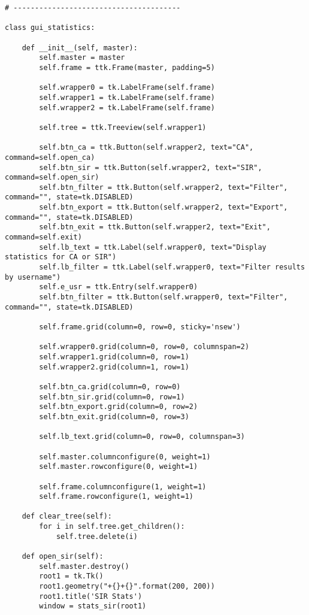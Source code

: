\documentclass[11pt, a4paper]{article}
\begin{document}
\begin{lstlisting}
# ---------------------------------------

class gui_statistics:

    def __init__(self, master):
        self.master = master
        self.frame = ttk.Frame(master, padding=5)

        self.wrapper0 = tk.LabelFrame(self.frame)
        self.wrapper1 = tk.LabelFrame(self.frame)
        self.wrapper2 = tk.LabelFrame(self.frame)

        self.tree = ttk.Treeview(self.wrapper1)

        self.btn_ca = ttk.Button(self.wrapper2, text="CA", command=self.open_ca)
        self.btn_sir = ttk.Button(self.wrapper2, text="SIR", command=self.open_sir)
        self.btn_filter = ttk.Button(self.wrapper2, text="Filter", command="", state=tk.DISABLED)
        self.btn_export = ttk.Button(self.wrapper2, text="Export", command="", state=tk.DISABLED)
        self.btn_exit = ttk.Button(self.wrapper2, text="Exit", command=self.exit)
        self.lb_text = ttk.Label(self.wrapper0, text="Display statistics for CA or SIR")
        self.lb_filter = ttk.Label(self.wrapper0, text="Filter results by username")
        self.e_usr = ttk.Entry(self.wrapper0)
        self.btn_filter = ttk.Button(self.wrapper0, text="Filter", command="", state=tk.DISABLED)

        self.frame.grid(column=0, row=0, sticky='nsew')

        self.wrapper0.grid(column=0, row=0, columnspan=2)
        self.wrapper1.grid(column=0, row=1)
        self.wrapper2.grid(column=1, row=1)

        self.btn_ca.grid(column=0, row=0)
        self.btn_sir.grid(column=0, row=1)
        self.btn_export.grid(column=0, row=2)
        self.btn_exit.grid(column=0, row=3)

        self.lb_text.grid(column=0, row=0, columnspan=3)

        self.master.columnconfigure(0, weight=1)
        self.master.rowconfigure(0, weight=1)

        self.frame.columnconfigure(1, weight=1)
        self.frame.rowconfigure(1, weight=1)

    def clear_tree(self):
        for i in self.tree.get_children():
            self.tree.delete(i)

    def open_sir(self):
        self.master.destroy()
        root1 = tk.Tk()
        root1.geometry("+{}+{}".format(200, 200))
        root1.title('SIR Stats')
        window = stats_sir(root1)


\end{lstlisting}
\end{document}
